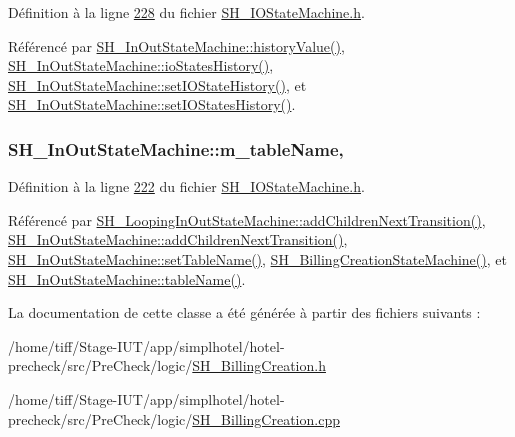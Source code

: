 Définition à la ligne \hyperlink{SH__IOStateMachine_8h_source_l00228}{228} du fichier \hyperlink{SH__IOStateMachine_8h_source}{S\-H\-\_\-\-I\-O\-State\-Machine.\-h}.



Référencé par \hyperlink{classSH__InOutStateMachine_af71bfdb3b59b7bf2763588b513b4205f}{S\-H\-\_\-\-In\-Out\-State\-Machine\-::history\-Value()}, \hyperlink{classSH__InOutStateMachine_a13889998c6dcd17db984dd6ed1454e80}{S\-H\-\_\-\-In\-Out\-State\-Machine\-::io\-States\-History()}, \hyperlink{classSH__InOutStateMachine_acbcce2c4300af1634d928b30e5e9be1c}{S\-H\-\_\-\-In\-Out\-State\-Machine\-::set\-I\-O\-State\-History()}, et \hyperlink{classSH__InOutStateMachine_af51f92c37d00a4eec4da42113cfd7d73}{S\-H\-\_\-\-In\-Out\-State\-Machine\-::set\-I\-O\-States\-History()}.

\hypertarget{classSH__InOutStateMachine_aa009eecc5ab6181358faafb5996b6006}{
\subsubsection[{m\-\_\-table\-Name}]{\setlength{\rightskip}{0pt plus 5cm}S\-H\-\_\-\-In\-Out\-State\-Machine\-::m\-\_\-table\-Name\hspace{0.3cm}{\ttfamily [protected]}, {\ttfamily [inherited]}}}\label{classSH__InOutStateMachine_aa009eecc5ab6181358faafb5996b6006}


Définition à la ligne \hyperlink{SH__IOStateMachine_8h_source_l00222}{222} du fichier \hyperlink{SH__IOStateMachine_8h_source}{S\-H\-\_\-\-I\-O\-State\-Machine.\-h}.



Référencé par \hyperlink{classSH__LoopingInOutStateMachine_abfae9f47019379f270496de46845c729}{S\-H\-\_\-\-Looping\-In\-Out\-State\-Machine\-::add\-Children\-Next\-Transition()}, \hyperlink{classSH__InOutStateMachine_aa78420f8778d7777809aad77eb8473b4}{S\-H\-\_\-\-In\-Out\-State\-Machine\-::add\-Children\-Next\-Transition()}, \hyperlink{classSH__InOutStateMachine_a95db31a7e7f31f36a8737adc739ab08c}{S\-H\-\_\-\-In\-Out\-State\-Machine\-::set\-Table\-Name()}, \hyperlink{classSH__BillingCreationStateMachine_ad62b77fa4aeafe200056ff3974562f83}{S\-H\-\_\-\-Billing\-Creation\-State\-Machine()}, et \hyperlink{classSH__InOutStateMachine_a4288a6c86ddf83effefff886675591c9}{S\-H\-\_\-\-In\-Out\-State\-Machine\-::table\-Name()}.



La documentation de cette classe a été générée à partir des fichiers suivants \-:\begin{DoxyCompactItemize}
\item 
/home/tiff/\-Stage-\/\-I\-U\-T/app/simplhotel/hotel-\/precheck/src/\-Pre\-Check/logic/\hyperlink{SH__BillingCreation_8h}{S\-H\-\_\-\-Billing\-Creation.\-h}\item 
/home/tiff/\-Stage-\/\-I\-U\-T/app/simplhotel/hotel-\/precheck/src/\-Pre\-Check/logic/\hyperlink{SH__BillingCreation_8cpp}{S\-H\-\_\-\-Billing\-Creation.\-cpp}\end{DoxyCompactItemize}
